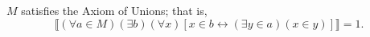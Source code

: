 $M$ satisfies the Axiom of Unions; that is,
$$
\llbracket (\forall a \in M)(\exists b)(\forall x)[x \in b \leftrightarrow (\exists y \in a)(x \in y)] \rrbracket = 1.
$$
